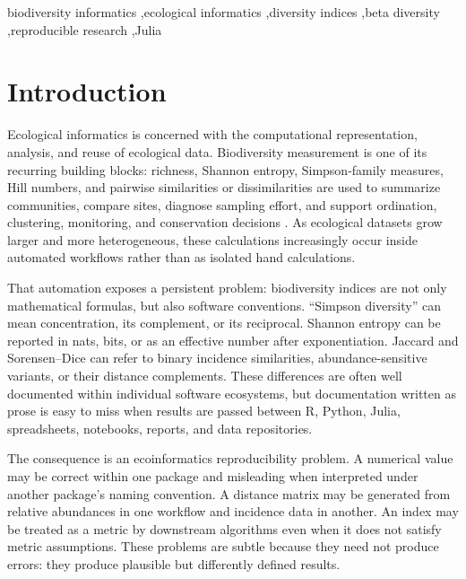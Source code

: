 \documentclass[preprint,12pt,authoryear]{elsarticle}
\begin{document}
\begin{frontmatter}
\begin{keyword}
biodiversity informatics \sep ecological informatics \sep diversity indices
\sep beta diversity \sep reproducible research \sep Julia
\end{keyword}

\end{frontmatter}

\section{Introduction}

Ecological informatics is concerned with the computational representation,
analysis, and reuse of ecological data.  Biodiversity measurement is one of
its recurring building blocks: richness, Shannon entropy, Simpson-family
measures, Hill numbers, and pairwise similarities or dissimilarities are used
to summarize communities, compare sites, diagnose sampling effort, and support
ordination, clustering, monitoring, and conservation decisions
\citep{hill1973diversity,jost2006entropy,chao1984nonparametric,
whittaker1960vegetation,legendre2012numerical}.  As ecological datasets grow
larger and more heterogeneous, these calculations increasingly occur inside
automated workflows rather than as isolated hand calculations.

That automation exposes a persistent problem: biodiversity indices are not
only mathematical formulas, but also software conventions.  ``Simpson
diversity'' can mean concentration, its complement, or its reciprocal.
Shannon entropy can be reported in nats, bits, or as an effective number after
exponentiation.  Jaccard and Sorensen--Dice can refer to binary incidence
similarities, abundance-sensitive variants, or their distance complements.
These differences are often well documented within individual software
ecosystems, but documentation written as prose is easy to miss when results
are passed between R, Python, Julia, spreadsheets, notebooks, reports, and
data repositories.

The consequence is an ecoinformatics reproducibility problem.  A numerical
value may be correct within one package and misleading when interpreted under
another package's naming convention.  A distance matrix may be generated from
relative abundances in one workflow and incidence data in another.  An index
may be treated as a metric by downstream algorithms even when it does not
satisfy metric assumptions.  These problems are subtle because they need not
produce errors: they produce plausible but differently defined results.
\end{document}
